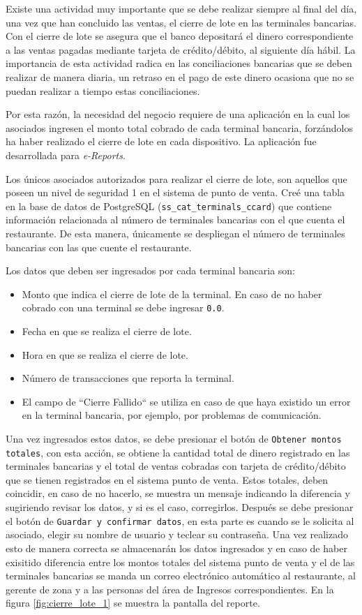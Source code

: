 Existe una actividad muy importante que se debe realizar siempre al final del día, una vez que han concluido las ventas, el cierre de lote en las terminales bancarias. Con el cierre de lote se asegura que el banco depositará el dinero correspondiente a las ventas pagadas mediante tarjeta de crédito/débito, al siguiente día hábil. La importancia de esta actividad radica en las conciliaciones bancarias que se deben realizar de manera diaria, un retraso en el pago de este dinero ocasiona que no se puedan realizar a tiempo estas conciliaciones.

Por esta razón, la necesidad del negocio requiere de una aplicación en la cual los asociados ingresen el monto total cobrado de cada terminal bancaria, forzándolos ha haber realizado el cierre de lote en cada dispositivo. La aplicación fue desarrollada para \textit{e-Reports}.

Los únicos asociados autorizados para realizar el cierre de lote, son aquellos que poseen un nivel de seguridad 1 en el sistema de punto de venta. Creé una tabla en la base de datos de PostgreSQL (\texttt{ss\_cat\_terminals\_ccard}) que contiene información relacionada al número de terminales bancarias con el que cuenta el restaurante. De esta manera, únicamente se despliegan el número de terminales bancarias con las que cuente el restaurante.

Los datos que deben ser ingresados por cada terminal bancaria son:

\begin{itemize}
 \item Monto que indica el cierre de lote de la terminal. En caso de no haber cobrado con una terminal se debe ingresar \texttt{0.0}.
 \item Fecha en que se realiza el cierre de lote.
 \item Hora en que se realiza el cierre de lote.
 \item Número de transacciones que reporta la terminal.
 \item El campo de ``Cierre Fallido`` se utiliza en caso de que haya existido un error en la terminal bancaria, por ejemplo, por problemas de comunicación.
\end{itemize}

Una vez ingresados estos datos, se debe presionar el botón de \texttt{Obtener montos totales}, con esta acción, se obtiene la cantidad total de dinero registrado en las terminales bancarias y el total de ventas cobradas con tarjeta de crédito/débito que se tienen registrados en el sistema punto de venta. Estos totales, deben coincidir, en caso de no hacerlo, se muestra un mensaje indicando la diferencia y sugiriendo revisar los datos, y si es el caso, corregirlos. Después se debe presionar el botón de \texttt{Guardar y confirmar datos}, en esta parte es cuando se le solicita al asociado, elegir su nombre de usuario y teclear su contraseña. Una vez realizado esto de manera correcta se almacenarán los datos ingresados y en caso de haber exisitido diferencia entre los montos totales del sistema punto de venta y el de las terminales bancarias se manda un correo electrónico automático al restaurante, al gerente de zona y a las personas del área de Ingresos correspondientes. En la figura \ref{fig:cierre_lote_1} se muestra la pantalla del reporte.



